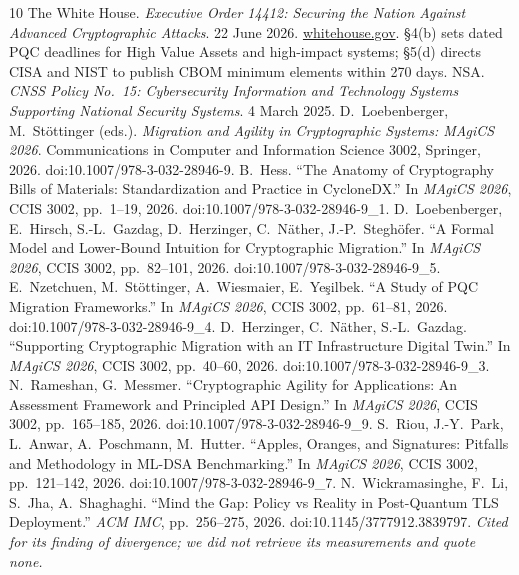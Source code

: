 \documentclass[conference]{IEEEtran}
\begin{document}
\sloppy
\begin{thebibliography}{10}
\small
{} The White House. \emph{Executive Order 14412: Securing the Nation Against
Advanced Cryptographic Attacks}. 22 June 2026.
\href{https://www.whitehouse.gov/presidential-actions/2026/06/securing-the-nation-against-advanced-cryptographic-attacks/}{whitehouse.gov}.
\S4(b) sets dated PQC deadlines for High Value Assets and high-impact systems;
\S5(d) directs CISA and NIST to publish CBOM minimum elements within 270 days.
 NSA. \emph{CNSS Policy No.~15: Cybersecurity Information and
Technology Systems Supporting National Security Systems}. 4 March 2025.
 D.~Loebenberger, M.~St\"ottinger (eds.). \emph{Migration and Agility in
Cryptographic Systems: MAgiCS 2026}. Communications in Computer and Information Science
3002, Springer, 2026. doi:10.1007/978-3-032-28946-9.
 B.~Hess. ``The Anatomy of Cryptography Bills of Materials:
Standardization and Practice in CycloneDX.'' In \emph{MAgiCS 2026}, CCIS 3002,
pp.~1--19, 2026. doi:10.1007/978-3-032-28946-9\_1.
 D.~Loebenberger, E.~Hirsch, S.-L.~Gazdag, D.~Herzinger,
C.~N\"ather, J.-P.~Stegh\"ofer. ``A Formal Model and Lower-Bound Intuition for Cryptographic
Migration.'' In \emph{MAgiCS 2026}, CCIS 3002, pp.~82--101, 2026.
doi:10.1007/978-3-032-28946-9\_5.
 E.~Nzetchuen, M.~St\"ottinger, A.~Wiesmaier, E.~Ye\c{s}ilbek. ``A
Study of PQC Migration Frameworks.'' In \emph{MAgiCS 2026}, CCIS 3002, pp.~61--81, 2026.
doi:10.1007/978-3-032-28946-9\_4.
 D.~Herzinger, C.~N\"ather, S.-L.~Gazdag. ``Supporting Cryptographic
Migration with an IT Infrastructure Digital Twin.'' In \emph{MAgiCS 2026}, CCIS 3002,
pp.~40--60, 2026. doi:10.1007/978-3-032-28946-9\_3.
 N.~Rameshan, G.~Messmer. ``Cryptographic Agility for Applications: An
Assessment Framework and Principled API Design.'' In \emph{MAgiCS 2026}, CCIS 3002,
pp.~165--185, 2026. doi:10.1007/978-3-032-28946-9\_9.
 S.~Riou, J.-Y.~Park, L.~Anwar, A.~Poschmann, M.~Hutter. ``Apples,
Oranges, and Signatures: Pitfalls and Methodology in ML-DSA Benchmarking.'' In
\emph{MAgiCS 2026}, CCIS 3002, pp.~121--142, 2026.
doi:10.1007/978-3-032-28946-9\_7.
 N.~Wickramasinghe, F.~Li, S.~Jha, A.~Shaghaghi. ``Mind the Gap:
Policy vs Reality in Post-Quantum TLS Deployment.'' \emph{ACM IMC}, pp.~256--275, 2026.
doi:10.1145/3777912.3839797. \textit{Cited for its finding of divergence; we did not
retrieve its measurements and quote none.}

\end{thebibliography}
\end{document}
